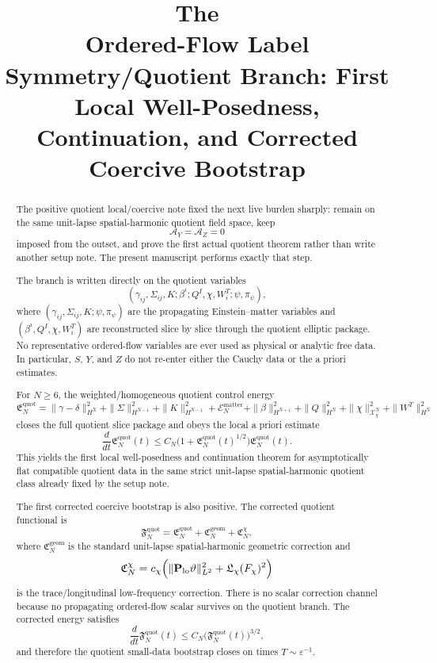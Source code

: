\documentclass[11pt]{article}
\title{\textbf{The \TheoryName{}}\\[0.4em]
\large Ordered-Flow Label Symmetry/Quotient Branch: First Local Well-Posedness, Continuation, and Corrected Coercive Bootstrap}
\author{}
\date{}
\newcommand{\AY}{\mathcal A_Y}
\newcommand{\AZ}{\mathcal A_Z}
\begin{document}
\maketitle

\begin{abstract}
The positive quotient local/coercive note fixed the next live burden sharply: remain on the same unit-lapse spatial-harmonic quotient field space, keep
\[
\AY=\AZ=0
\]
imposed from the outset, and prove the first actual quotient theorem rather than write another setup note. The present manuscript performs exactly that step.

The branch is written directly on the quotient variables
\[
(\gamma_{ij},\Sigma_{ij},K;\beta^i;Q^I,\chi,W_i^T;\psi,\pi_\psi),
\]
where \((\gamma_{ij},\Sigma_{ij},K;\psi,\pi_\psi)\) are the propagating Einstein--matter variables and \((\beta^i,Q^I,\chi,W_i^T)\) are reconstructed slice by slice through the quotient elliptic package. No representative ordered-flow variables are ever used as physical or analytic free data. In particular, \(S\), \(Y\), and \(Z\) do not re-enter either the Cauchy data or the a priori estimates.

For \(N\ge 6\), the weighted/homogeneous quotient control energy
\[
\mathfrak E_N^{\mathrm{quot}}
=
\|\gamma-\delta\|_{H^N}^2
+\|\Sigma\|_{H^{N-1}}^2
+\|K\|_{H^{N-1}}^2
+\mathcal E_N^{\mathrm{matter}}
+\|\beta\|_{H^{N+1}}^2
+\|Q\|_{H^N}^2
+\|\chi\|_{\mathcal X_\chi^N}^2
+\|W^T\|_{H^N}^2
\]
closes the full quotient slice package and obeys the local a priori estimate
\[
\frac{d}{dt}\mathfrak E_N^{\mathrm{quot}}(t)
\le
C_N\bigl(1+\mathfrak E_N^{\mathrm{quot}}(t)^{1/2}\bigr)\mathfrak E_N^{\mathrm{quot}}(t).
\]
This yields the first local well-posedness and continuation theorem for asymptotically flat compatible quotient data in the same strict unit-lapse spatial-harmonic quotient class already fixed by the setup note.

The first corrected coercive bootstrap is also positive. The corrected quotient functional is
\[
\mathfrak F_N^{\mathrm{quot}}
=
\mathfrak E_N^{\mathrm{quot}}
+\mathfrak C_N^{\mathrm{geom}}
+\mathfrak C_N^{\chi},
\]
where \(\mathfrak C_N^{\mathrm{geom}}\) is the standard unit-lapse spatial-harmonic geometric correction and
\[
\mathfrak C_N^{\chi}
=
c_\chi\Bigl(
\|\mathbf P_{\mathrm{lo}}\vartheta\|_{L^2}^2
+\mathfrak L_\chi(F_\chi)^2
\Bigr)
\]
is the trace/longitudinal low-frequency correction. There is no scalar correction channel because no propagating ordered-flow scalar survives on the quotient branch. The corrected energy satisfies
\[
\frac{d}{dt}\mathfrak F_N^{\mathrm{quot}}(t)
\le
C_N\bigl(\mathfrak F_N^{\mathrm{quot}}(t)\bigr)^{3/2},
\]
and therefore the quotient small-data bootstrap closes on times \(T\sim \varepsilon^{-1}\).


\end{abstract}
\end{document}

